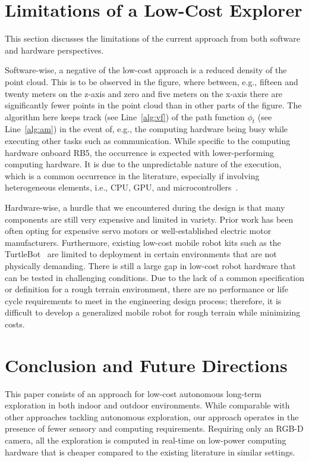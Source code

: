 \documentclass[letterpaper,10pt,conference,twoside]{IEEEtran}
\theoremstyle{definition}
\begin{document}
\section{Limitations of a Low-Cost Explorer}\label{sec:lim}
\noindent
This section discusses the limitations of the current approach from both software and hardware perspectives.

Software-wise, a negative of the low-cost approach is a reduced density of the point cloud. This 
is to be observed in the figure, where between, e.g., fifteen and twenty meters on the z-axis and zero and five meters on the x-axis there are significantly fewer points in the point cloud than in other parts of the figure. 
The algorithm here keeps track (see Line~\ref{alg:vf}) of the path function $\phi_t$ (see Line~\ref{alg:am}) in the event of, e.g., the computing hardware being busy while executing other tasks such as communication. While specific to the computing hardware onboard RB5, the occurrence is expected with lower-performing computing hardware. It is due to the unpredictable nature of the execution, which is a common occurrence in the literature, especially if involving heterogeneous elements, i.e., CPU, GPU, and microcontrollers~\cite{seewald2019coarse}.

Hardware-wise, a hurdle that we encountered during the design is that many components are still very expensive and limited in variety. Prior work has been often opting for expensive servo motors or well-established electric motor manufacturers.
%
Furthermore, existing low-cost mobile robot kits such as the TurtleBot~\cite{amster2020turtlebot} are limited to deployment in certain environments that are not physically demanding. There is still a large gap in low-cost robot hardware that can be tested in challenging conditions. Due to the lack of a common specification or definition for a rough terrain environment, there are no performance or life cycle requirements to meet in the engineering design process; therefore, it is difficult to develop a generalized mobile robot for rough terrain while minimizing costs.

\section{Conclusion and Future Directions}
\label{sec:cf}
\noindent
This paper consists of an %
approach %
for low-cost autonomous long-term exploration in both indoor and outdoor %
environments. While comparable with other %
approaches tackling autonomous exploration, %
our approach %
operates in the presence of fewer sensory and computing requirements. Requiring only an RGB-D camera, all the exploration is computed in real-time on low-power computing hardware that is cheaper compared to the existing literature %
in similar settings.%
\end{document}
